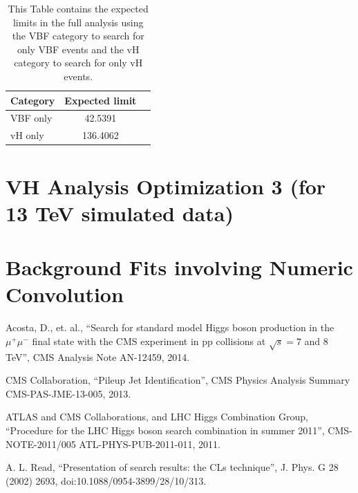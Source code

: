 \documentclass[12pt]{article}
\begin{document}

\begin{table}[!hbtp]
  \begin{center}
    \caption{ \label{tab:ExpectedLimitsTable}
        This Table contains the expected limits in the full analysis using the VBF category to search for only VBF events 
	and the vH category to search for only vH events.
    }
    \begin{tabular}{lcc} \hline \hline
         Category & Expected limit \\ \hline
         VBF only & 42.5391  \\
         vH only & 136.4062 \\
     \hline \hline
    \end{tabular}
  \end{center}
\end{table}

\section{VH Analysis Optimization 3 (for 13 TeV simulated data)}

\section{Background Fits involving Numeric Convolution}

\begin{thebibliography}{9}

  Acosta, D., et. al.,
  ``Search for standard model Higgs boson production in the $\mu^+\mu^-$ final state with the CMS experiment in pp collisions at $\sqrt{s}=7$ and 8\, TeV'',
  CMS Analysis Note AN-12459,
  2014.

  CMS Collaboration, ``Pileup Jet Identification'', 
  CMS Physics Analysis Summary CMS-PAS-JME-13-005, 
  2013.

  ATLAS and CMS Collaborations, and LHC Higgs Combination Group, ``Procedure for
  the LHC Higgs boson search combination in summer 2011'', 
  CMS-NOTE-2011/005 ATL-PHYS-PUB-2011-011, 2011.

  A. L. Read, ``Presentation of search results: the CLs technique'', J. Phys. G 28 (2002) 2693,
  doi:10.1088/0954-3899/28/10/313.

\end{thebibliography}
\end{document}
